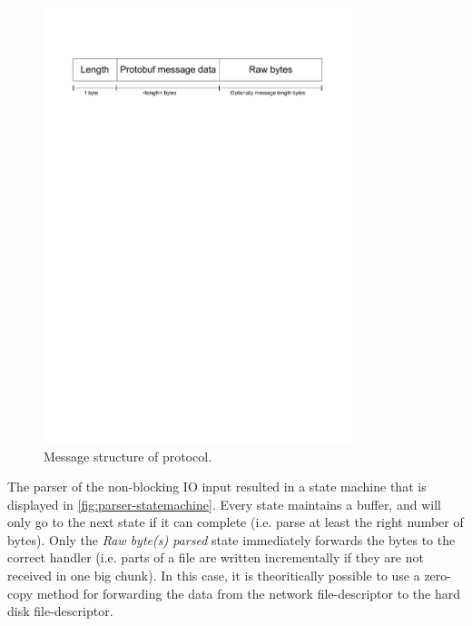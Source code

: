 \documentclass[12pt,a4paper]{scrartcl}
\begin{document}

\begin{figure}[H]
\centering
\includegraphics[width=0.8\textwidth,trim=0 24cm 0 3cm,clip=true]{diagrams/message-structure.pdf}
\caption{Message structure of protocol.}
\label{fig:message-structure}
\end{figure}

The parser of the non-blocking IO input resulted in a state machine that is displayed in \autoref{fig:parser-statemachine}. Every state maintains a buffer, and will only go to the next state if it can complete (i.e. parse at least the right number of bytes). Only the \emph{Raw byte(s) parsed} state immediately forwards the bytes to the correct handler (i.e. parts of a file are written incrementally if they are not received in one big chunk). In this case, it is theoritically possible to use a zero-copy method for forwarding the data from the network file-descriptor to the hard disk file-descriptor.
\end{document}
